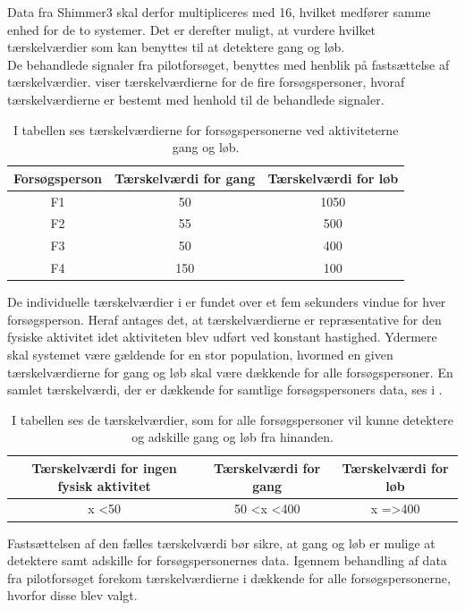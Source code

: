 Data fra Shimmer3 skal derfor multipliceres med 16, hvilket medfører samme enhed for de to systemer. Det er derefter muligt, at vurdere hvilket tærskelværdier som kan benyttes til at detektere gang og løb.\\
De behandlede signaler fra pilotforsøget, benyttes med henblik på fastsættelse af tærskelværdier.  viser tærskelværdierne for de fire forsøgspersoner, hvoraf tærskelværdierne er bestemt med henhold til de behandlede signaler. 
\begin{table}[H]
	\centering
	\begin{tabular}{ccc}
		\hline
		\rowcolor[HTML]{C0C0C0} 
		Forsøgsperson & Tærskelværdi for gang & Tærskelværdi for løb \\ \hline
		\rowcolor[HTML]{FFFFFF} 
		F1 & 50 & 1050 \\ \hline
		\rowcolor[HTML]{FFFFFF} 
		F2 & 55 & 500 \\ \hline
		\rowcolor[HTML]{FFFFFF} 
		F3 & 50 & 400 \\ \hline
		\rowcolor[HTML]{FFFFFF} 
		F4 & 150 & 100 \\ \hline
	\end{tabular}
	\caption{I tabellen ses tærskelværdierne for forsøgspersonerne ved aktiviteterne gang og løb.}
	\label{tab:individuel_taerskel}
\end{table}\vspace{-0.5cm}
De individuelle tærskelværdier i  er fundet over et fem sekunders vindue for hver forsøgsperson. Heraf antages det, at tærskelværdierne er repræsentative for den fysiske aktivitet idet aktiviteten blev udført ved konstant hastighed. Ydermere skal systemet være gældende for en stor population, hvormed en given tærskelværdierne for gang og løb skal være dækkende for alle forsøgspersoner. En samlet tærskelværdi, der er dækkende for samtlige forsøgspersoners data, ses i .
\begin{table}[H]
	\centering
	\begin{tabular}{ccc}
		\hline
		\rowcolor[HTML]{C0C0C0} 
		Tærskelværdi for ingen fysisk aktivitet & Tærskelværdi for gang & Tærskelværdi for løb \\ \hline
		x \textless 50 & 50 \textless x \textless 400 & x =\textgreater 400 \\ \hline
	\end{tabular}
	\caption{I tabellen ses de tærskelværdier, som for alle forsøgspersoner vil kunne detektere og adskille gang og løb fra hinanden.}
	\label{tab:faelles_taerskel}
\end{table}\vspace{-0.5cm}
Fastsættelsen af den fælles tærskelværdi bør sikre, at gang og løb er mulige at detektere samt adskille for forsøgspersonernes data. Igennem behandling af data fra pilotforsøget forekom tærskelværdierne i  dækkende for alle forsøgspersonerne, hvorfor disse blev valgt.

